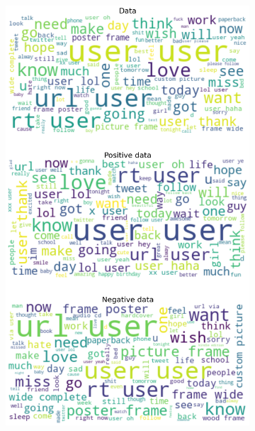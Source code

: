 \documentclass{article}
\begin{document}
\begin{itemize}
  \begin{figure}[H]
    \centering
    \captionsetup{justification=centering}
    \begin{subfigure}[b]{0.24\textwidth}
      \centering
      \includegraphics[width=\textwidth]{chapter-06/section-01-01/11/visualization/1/wordcloud.png}
    \end{subfigure}
    \begin{subfigure}[b]{0.24\textwidth}
      \centering

\end{subfigure}
\end{figure}
\end{itemize}
\end{document}
